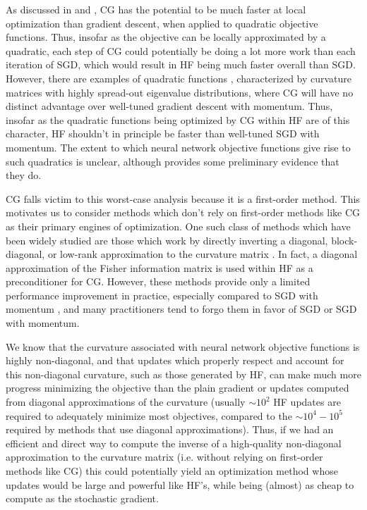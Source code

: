 \documentclass[12pt]{article}
\begin{document}
As discussed in \citet{HF_chapter} and \citet{momentum_ilya}, CG has the potential to be much faster at local optimization than gradient descent, when applied to quadratic objective functions.  Thus, insofar as the objective can be locally approximated by a quadratic, each step of CG could potentially be doing a lot more work than each iteration of SGD, which would result in HF being much faster overall than SGD.  However, there are examples of quadratic functions \citep[e.g.][]{cg_hardcase}, characterized by curvature matrices with highly spread-out eigenvalue distributions, where CG will have no distinct advantage over well-tuned gradient descent with momentum.  Thus, insofar as the quadratic functions being optimized by CG within HF are of this character, HF shouldn't in principle be faster than well-tuned SGD with momentum.  The extent to which neural network objective functions give rise to such quadratics is unclear, although \citet{momentum_ilya} provides some preliminary evidence that they do. %

CG falls victim to this worst-case analysis because it is a first-order method.  This motivates us to consider methods which don't rely on first-order methods like CG as their primary engines of optimization.   One such class of methods which have been widely studied are those which work by directly inverting a diagonal, block-diagonal, or low-rank approximation to the curvature matrix \citep[e.g.][]{diag_lecun, pesky, ADADELTA, TONGA, Ollivier}.  In fact, a diagonal approximation of the Fisher information matrix is used within HF as a preconditioner for CG.  However, these methods provide only a limited performance improvement in practice, especially compared to SGD with momentum \citep[see for example][]{oLBFGS, ADADELTA}, and many practitioners tend to forgo them in favor of SGD or SGD with momentum.

We know that the curvature associated with neural network objective functions is highly non-diagonal, and that updates which properly respect and account for this non-diagonal curvature, such as those generated by HF, can make much more progress minimizing the objective than the plain gradient or updates computed from diagonal approximations of the curvature (usually $\sim\!\!10^2$ HF updates are required to adequately minimize most objectives, compared to the $\sim\!\!\!\!10^4-10^5$ required by methods that use diagonal approximations). %
Thus, if we had an efficient and direct way to compute the inverse of a high-quality non-diagonal approximation to the curvature matrix (i.e. without relying on first-order methods like CG) this could potentially yield an optimization method whose updates would be large and powerful like HF's, while being (almost) as cheap to compute as the stochastic gradient.
\end{document}
